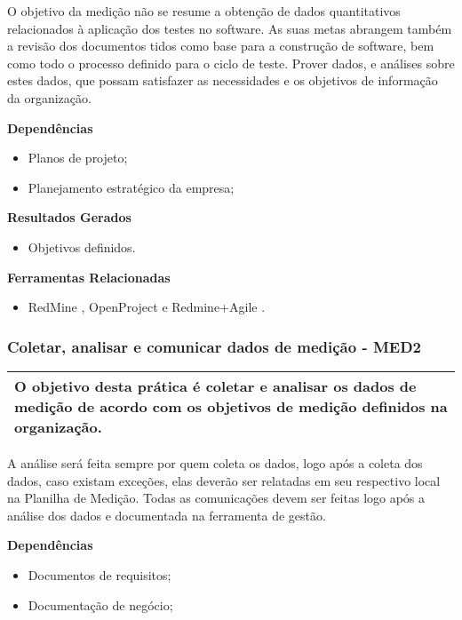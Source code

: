 O objetivo da medição não se resume a obtenção de dados quantitativos relacionados à aplicação dos testes no software. As suas metas abrangem também a revisão dos documentos tidos como base para a construção de software, bem como todo o processo definido para o ciclo de teste. Prover dados, e análises sobre estes dados, que possam satisfazer as necessidades e os objetivos de informação da organização.

\textbf{ Dependências}
\begin{itemize}
    \item Planos de projeto;
    \item Planejamento estratégico da empresa;
\end{itemize}

\textbf{Resultados Gerados }
\begin{itemize}
    \item Objetivos definidos.
\end{itemize}

\textbf{Ferramentas Relacionadas }
\begin{itemize}
    \item RedMine \cite{Redmine}, OpenProject \cite{OpenProject} e Redmine+Agile \cite{RedmineUP}.
\end{itemize}

\subsubsection{Coletar, analisar e comunicar dados de medição - MED2}
\label{sec:med2}

\begin{table}[!ht]
\centering
\begin{tabular}{|p{130mm}|}
\hline
O objetivo desta prática é coletar e analisar os dados de medição de acordo com os objetivos de medição definidos na organização. \\ 
\hline
\end{tabular}
\end{table}

A análise será feita sempre por quem coleta os dados, logo após a coleta dos dados, caso existam exceções, elas deverão ser relatadas em seu respectivo local na Planilha de Medição. Todas as comunicações devem ser feitas logo após a análise dos dados e documentada na ferramenta de gestão.

\textbf{Dependências}
\begin{itemize}
    \item Documentos de requisitos;
    \item Documentação de negócio;
\end{itemize}

